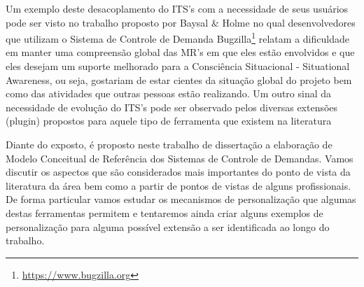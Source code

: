 \documentclass[msc,proposal,hidelot,hideabstract]{ppgccufmg} %
\begin{document}
Um exemplo deste desacoplamento do ITS's com a necessidade de seus usuários
pode ser visto no trabalho proposto por Baysal \& Holme \cite{baysal2012qualitative} no qual desenvolvedores que utilizam o Sistema de
Controle de Demanda Bugzilla\footnote{\url{https://www.bugzilla.org}} relatam a
dificuldade em manter uma compreensão global das MR's em que eles estão
envolvidos e que eles desejam um suporte melhorado para a Consciência
Situacional - Situational Awareness, ou seja, gostariam de estar cientes da
situação global do projeto bem como das atividades que outras pessoas estão realizando. Um outro sinal da necessidade de evolução do
ITS's pode ser observado pelos diversas extensões (plugin) propostos para
aquele tipo de ferramenta que existem na literatura \cite{101186,Thung:2014:BIT:2635868.2661678,Kononenko:2014:DED:2591062.2591075}

Diante do exposto, é proposto neste  trabalho de dissertação a elaboração de
Modelo Conceitual de Referência dos Sistemas de Controle de Demandas. Vamos discutir os aspectos que são
considerados mais importantes do ponto de vista da literatura
da área bem como a partir de pontos de vistas de alguns profissionais. De forma particular vamos estudar os mecanismos de
personalização que algumas destas ferramentas permitem e tentaremos ainda criar alguns exemplos de personalização para alguma possível
extensão a ser identificada ao longo do trabalho.
\end{document}

